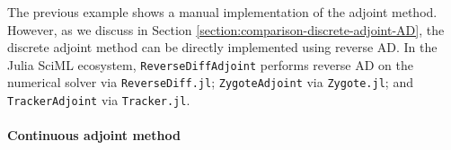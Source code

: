 The previous example shows a manual implementation of the adjoint method. 
However, as we discuss in Section \ref{section:comparison-discrete-adjoint-AD}, the discrete adjoint method can be directly implemented using reverse AD. 
In the Julia SciML ecosystem, \texttt{ReverseDiffAdjoint} performs reverse AD on the numerical solver via \texttt{ReverseDiff.jl}; \texttt{ZygoteAdjoint} via \texttt{Zygote.jl}; and \texttt{TrackerAdjoint} via \texttt{Tracker.jl}. 


\paragraph{Continuous adjoint method}

